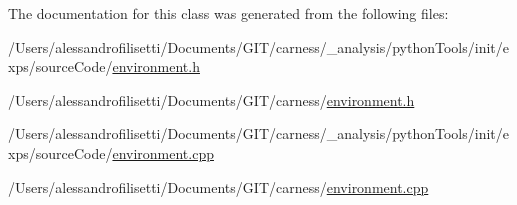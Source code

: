 The documentation for this class was generated from the following files\-:\begin{DoxyCompactItemize}
\item 
/\-Users/alessandrofilisetti/\-Documents/\-G\-I\-T/carness/\-\_\-analysis/python\-Tools/init/exps/source\-Code/\hyperlink{a00062}{environment.\-h}\item 
/\-Users/alessandrofilisetti/\-Documents/\-G\-I\-T/carness/\hyperlink{a00063}{environment.\-h}\item 
/\-Users/alessandrofilisetti/\-Documents/\-G\-I\-T/carness/\-\_\-analysis/python\-Tools/init/exps/source\-Code/\hyperlink{a00060}{environment.\-cpp}\item 
/\-Users/alessandrofilisetti/\-Documents/\-G\-I\-T/carness/\hyperlink{a00061}{environment.\-cpp}\end{DoxyCompactItemize}
